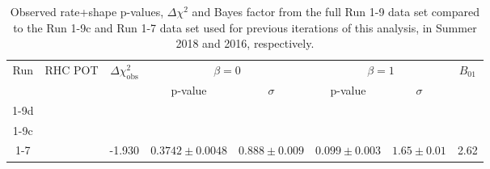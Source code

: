 \begin{table}
	\centering
	\begin{tabular}{|c|c|c|c|c|c|c|c|}
		\hline
		\multirow{2}{*}{Run} & \multirow{2}{*}{RHC POT} & \multirow{2}{*}{$\Delta \chi^2_{\textrm{obs}}$} & \multicolumn{2}{|c|}{$\beta=0$} & \multicolumn{2}{|c|}{$\beta=1$} & \multirow{2}{*}{$B_{01}$}\\
		\cline{4-7}      				
		                     &   				 	    &                                                 & p-value         & $\sigma$      & p-value         & $\sigma$      &   \\
		\hline
		
		
		1-9d                 & \TotalPotNuBarRunOneNine & \DeltachisqDataRunOneNineD                      & \pvalRateShapeBetaZeroDataRunOneNineD & \sigmaRateShapeBetaZeroDataRunOneNineD & \pvalRateShapeBetaOneDataRunOneNineD & \sigmaRateShapeBetaOneDataRunOneNineD & \BayesFactorDataRunOneNineD \\
		\hline
		
		
		1-9c                 & \TotalPotNuBarRunOneNineC& \DeltachisqData                                 & \pvalRateShapeBetaZeroData & \sigmaRateShapeBetaZeroData & \pvalRateShapeBetaOneData & \sigmaRateShapeBetaOneData & \BayesFactorData \\
		\hline
		
		
		1-7                  &\TotalPotNuBarRunOneSevenC& -1.930			                              & $0.3742 \pm 0.0048$			& $0.888 \pm 0.009$		    & $0.099 \pm 0.003$		      & $1.65 \pm 0.01$		  & 2.62 \\
		\hline
	\end{tabular}
	\caption{Observed rate+shape p-values, $\Delta \chi^2$ and Bayes factor from the full Run 1-9 data set compared to the Run 1-9c and Run 1-7 data set used for previous iterations of this analysis, in Summer 2018 and 2016\cite{OurRun16AntiNueBarAppearanceAnalysis3Flavour}, respectively.}
	\label{tab:data_comparison_shape_R19d_R17}
\end{table}